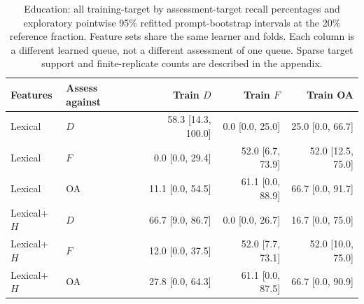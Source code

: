 \begin{table}[htbp]
\centering\small
\caption{Education: all training-target by assessment-target recall percentages and exploratory pointwise 95\% refitted prompt-bootstrap intervals at the 20\% reference fraction. Feature sets share the same learner and folds. Each column is a different learned queue, not a different assessment of one queue. Sparse target support and finite-replicate counts are described in the appendix.}
\label{tab:transfereducation}
\begin{tabular}{llrrr}
\toprule
Features & Assess against & Train $D$ & Train $F$ & Train OA \\
\midrule
Lexical & $D$ & 58.3 [14.3, 100.0] & 0.0 [0.0, 25.0] & 25.0 [0.0, 66.7] \\
Lexical & $F$ & 0.0 [0.0, 29.4] & 52.0 [6.7, 73.9] & 52.0 [12.5, 75.0] \\
Lexical & OA & 11.1 [0.0, 54.5] & 61.1 [0.0, 88.9] & 66.7 [0.0, 91.7] \\
Lexical+$H$ & $D$ & 66.7 [9.0, 86.7] & 0.0 [0.0, 26.7] & 16.7 [0.0, 75.0] \\
Lexical+$H$ & $F$ & 12.0 [0.0, 37.5] & 52.0 [7.7, 73.1] & 52.0 [10.0, 75.0] \\
Lexical+$H$ & OA & 27.8 [0.0, 64.3] & 61.1 [0.0, 87.5] & 66.7 [0.0, 90.9] \\
\bottomrule
\end{tabular}
\end{table}

